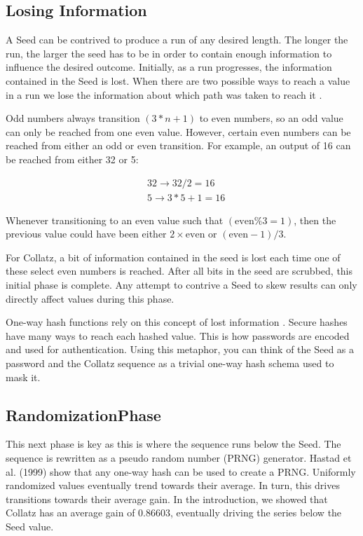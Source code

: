 \documentclass[letterpaper]{article}
\begin{document}
\subsection{Losing Information}
A Seed can be contrived to produce a run of any desired length. The longer the run, the larger the seed has to be in order to contain enough information to influence the desired outcome. Initially, as a run progresses, the information contained in the Seed is lost. When there are two possible ways to reach a value in a run we lose the information about which path was taken to reach it \cite{2}.

Odd numbers always transition $(3*n + 1)$ to even numbers, so an odd value can only be reached from one even value. However, certain even numbers can be reached from either an odd or even transition. For example, an output of 16 can be reached from either 32 or 5:

\[
\begin{aligned}
    &32 \rightarrow 32 / 2 = 16 \\
    &5 \rightarrow 3*5 + 1 = 16
\end{aligned}
\]

Whenever transitioning to an even value such that $(\text{even} \% 3 = 1)$, then the previous value could have been either $2 \times \text{even}$ or $(\text{even} - 1) / 3$.

For Collatz, a bit of information contained in the seed is lost each time one of these select even numbers is reached. After all bits in the seed are scrubbed, this initial phase is complete. Any attempt to contrive a Seed to skew results can only directly affect values during this phase.

One-way hash functions rely on this concept of lost information \cite{3}. Secure hashes have many ways to reach each hashed value. This is how passwords are encoded and used for authentication. Using this metaphor, you can think of the Seed as a password and the Collatz sequence as a trivial one-way hash schema used to mask it.

\subsection{RandomizationPhase}

This next phase is key as this is where the sequence runs below the Seed. The sequence is rewritten as a pseudo random number (PRNG) generator. Hastad et al. (1999) \cite{4} show that any one-way hash can be used to create a PRNG. Uniformly randomized values eventually trend towards their average. In turn, this drives transitions towards their average gain. In the introduction, we showed that Collatz has an average gain of $0.86603$, eventually driving the series below the Seed value.
\end{document}
